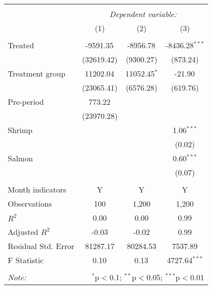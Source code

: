\begin{table}[!htbp] \centering
\begin{tabular}{@{\extracolsep{5pt}}lccc}
\\[-1.8ex]\hline
\hline \\[-1.8ex]
& \multicolumn{3}{c}{\textit{Dependent variable:}} \
\cr \cline{3-4}
\\[-1.8ex] & (1) & (2) & (3) \\
\hline \\[-1.8ex]
 Treated & -9591.35$^{}$ & -8956.78$^{}$ & -8436.28$^{***}$ \\
  & (32619.42) & (9300.27) & (873.24) \\
 Treatment group & 11202.04$^{}$ & 11052.45$^{*}$ & -21.90$^{}$ \\
  & (23065.41) & (6576.28) & (619.76) \\
 Pre-period & 773.22$^{}$ & & \\
  & (23970.28) & & \\
 Shrimp & & & 1.06$^{***}$ \\
  & & & (0.02) \\
 Salmon & & & 0.60$^{***}$ \\
  & & & (0.07) \\
\hline \\[-1.8ex]
 Month indicators & Y & Y & Y \\
 Observations & 100 & 1,200 & 1,200 \\
 $R^2$ & 0.00 & 0.00 & 0.99 \\
 Adjusted $R^2$ & -0.03 & -0.02 & 0.99 \\
 Residual Std. Error & 81287.17 & 80284.53 & 7537.89  \\
 F Statistic & 0.10$^{}$  & 0.13$^{}$  & 4727.64$^{***}$  \\
\hline
\hline \\[-1.8ex]
\textit{Note:} & \multicolumn{3}{r}{$^{*}$p$<$0.1; $^{**}$p$<$0.05; $^{***}$p$<$0.01} \\
\end{tabular}
\end{table}